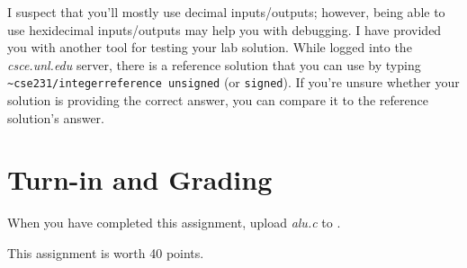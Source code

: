 I suspect that you'll mostly use decimal inputs/outputs; however, being able to
use hexidecimal inputs/outputs may help you with debugging.  I have provided
you with another tool for testing your lab solution.  While logged into the
\textit{csce.unl.edu} server, there is a reference solution that you can use by
typing \texttt{\~{}cse231/integerreference~unsigned} (or \texttt{signed}).  If
you're unsure whether your solution is providing the correct answer, you can
compare it to the reference solution's answer.

\section*{Turn-in and Grading}

When you have completed this assignment, upload \textit{alu.c} to
\filesubmission.

This assignment is worth 40 points. \\

